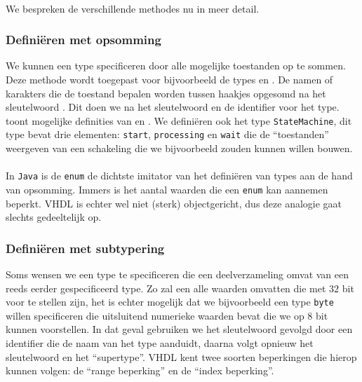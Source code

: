 \paragraph{}
We bespreken de verschillende methodes nu in meer detail.

\subsubsection{Defini\"eren met opsomming}
We kunnen een type specificeren door alle mogelijke toestanden op te sommen. Deze methode wordt toegepast voor bijvoorbeeld de types  en . De namen of karakters die de toestand bepalen worden tussen haakjes opgesomd na het sleutelwoord . Dit doen we na het sleutelwoord  en de identifier voor het type.  toont mogelijke definities van  en . We defini\"eren ook het type \texttt{StateMachine}, dit type bevat drie elementen: \texttt{start}, \texttt{processing} en \texttt{wait} die de ``toestanden'' weergeven van een schakeling die we bijvoorbeeld zouden kunnen willen bouwen.


\paragraph{}
In \texttt{Java} is de \texttt{enum} de dichtste imitator van het defini\"eren van types aan de hand van opsomming. Immers is het aantal waarden die een \texttt{enum} kan aannemen beperkt. VHDL is echter wel niet (sterk) objectgericht, dus deze analogie gaat slechts gedeeltelijk op.


\subsubsection{Defini\"eren met subtypering}

Soms wensen we een type te specificeren die een deelverzameling omvat van een reeds eerder gespecificeerd type. Zo zal een  alle waarden omvatten die met $32$ bit voor te stellen zijn, het is echter mogelijk dat we bijvoorbeeld een type \texttt{byte} willen specificeren die uitsluitend numerieke waarden bevat die we op $8$ bit kunnen voorstellen. In dat geval gebruiken we het sleutelwoord  gevolgd door een identifier die de naam van het type aanduidt, daarna volgt opnieuw het sleutelwoord  en het ``supertype''. VHDL kent twee soorten beperkingen die hierop kunnen volgen: de ``range beperking'' en de ``index beperking''.

